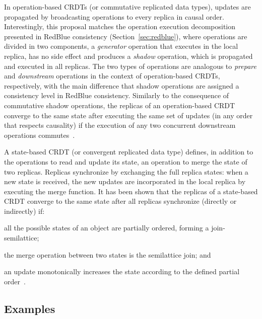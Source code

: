 In operation-based CRDTs (or commutative replicated data types), updates
are propagated by broadcasting operations to every replica in causal order.
Interestingly, this proposal matches the operation execution decomposition presented
in RedBlue consistency (Section~\ref{sec:redblue}), where operations are divided in two components, a {\em generator}
operation that executes in the local replica, has no side effect and produces a
{\em shadow} operation, which is propagated and executed in all replicas. 
The two types of operations are analogous to {\em prepare} and {\em downstream} operations
in the context of  operation-based CRDTs, respectively, with the main difference that shadow operations are assigned a consistency level in RedBlue consistency.
Similarly to the consequence of commutative shadow operations, the replicas of an operation-based CRDT converge to the same state after executing the same set of updates (in any order that respects causality)
if the execution of any two concurrent downstream operations commutes~\cite{crdts}.

A state-based CRDT (or convergent replicated data type) defines, in addition to
the operations to read and update its state, an operation to merge the
state of two replicas.
Replicas synchronize by exchanging the full replica states: when a new
state is received, the new updates are incorporated in the local replica
by executing the merge function.
It has been shown that the replicas of a state-based CRDT converge to the same state
after all replicas synchronize (directly or indirectly) if:
\begin{inparaenum}[(1)]
\item all the possible states of an object are partially ordered, forming a
join-semilattice;
\item the merge operation between two states is the semilattice join; and
\item an update monotonically increases the state according to the defined
partial order~\cite{crdts}.
\end{inparaenum}

\subsection{Examples}

